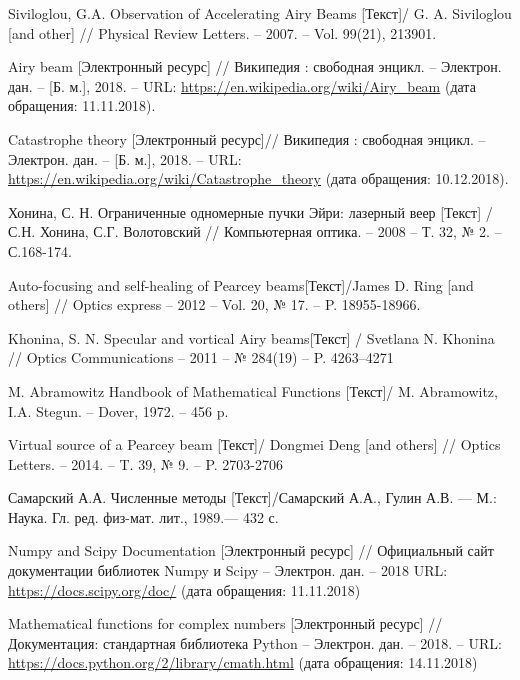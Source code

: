 \renewcommand\refname{Список использованных источников}
\begin{thebibliography}{20}
\setlength{\itemindent}{1.25cm}

Siviloglou, G.A. Observation of Accelerating Airy Beams [Текст]/ G. A.
Siviloglou [and other] // Physical Review Letters. -- 2007. -- Vol. 99(21), 213901.

	 Airy beam [Электронный ресурс] // Википедия : свободная энцикл. –
Электрон. дан. – [Б. м.], 2018. – URL: \url{https://en.wikipedia.org/wiki/Airy_beam} (дата обращения: 11.11.2018).


	Catastrophe theory [Электронный ресурс]// Википедия : свободная
энцикл. – Электрон. дан. – [Б. м.], 2018. – URL:  \url{https://en.wikipedia.org/wiki/Catastrophe_theory}  (дата обращения: 10.12.2018).


	
	  Хонина, С. Н. Ограниченные одномерные пучки Эйри: лазерный веер
[Текст] / С.Н. Хонина, С.Г. Волотовский // Компьютерная оптика. – 2008 – Т.
32, № 2. – С.168-174. 
	
 Auto-focusing and self-healing of Pearcey beams[Текст]/James D. Ring [and others] // Optics express -- 2012 -- Vol. 20, № 17. -- P. 18955-18966.


Khonina, S. N. Specular and vortical Airy beams[Текст] / Svetlana N.
Khonina // Optics Communications – 2011 – № 284(19) – P. 4263–4271 

 M. Abramowitz Handbook of Mathematical Functions [Текст]/ M.
Abramowitz, I.A. Stegun. – Dover, 1972. – 456 p.

Virtual source of a Pearcey beam [Текст]/ Dongmei Deng [and others] // Optics Letters. – 2014. –
T. 39, № 9. – P. 2703-2706 

  Самарский А.А. Численные методы  [Текст]/Самарский А.А., Гулин А.В. — М.: Наука. Гл. ред. физ-мат. лит., 1989.— 432 с.

Numpy and Scipy Documentation [Электронный ресурс] // Официальный
сайт документации библиотек Numpy и Scipy – Электрон. дан. – 2018 URL:
\url{https://docs.scipy.org/doc/} (дата обращения: 11.11.2018)

Mathematical functions for complex numbers [Электронный
ресурс] //Документация: стандартная библиотека Python – Электрон. дан. – 2018. – URL: \url{https://docs.python.org/2/library/cmath.html} (дата обращения:
14.11.2018)


\end{thebibliography}
